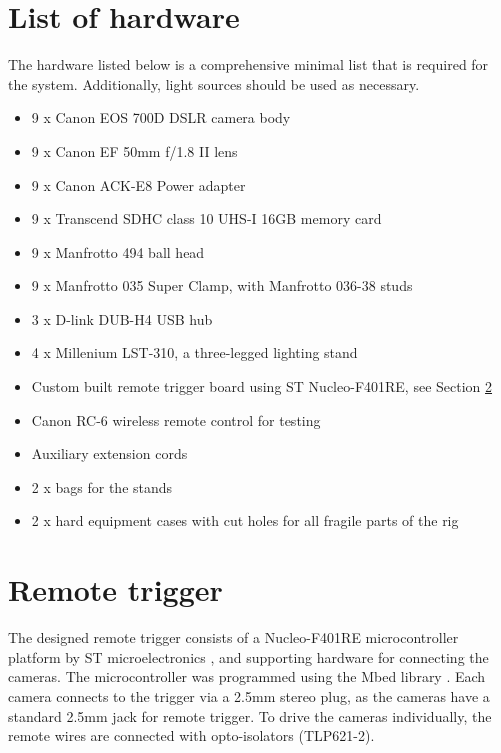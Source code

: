 \section{List of hardware} \label{app:hardwareused}

The hardware listed below is a comprehensive minimal list that is required for the system.
Additionally, light sources should be used as necessary.

\begin{itemize}
	\item 9 x Canon EOS 700D DSLR camera body
	\item 9 x Canon EF 50mm f/1.8 II lens
	\item 9 x Canon ACK-E8 Power adapter
	\item 9 x Transcend SDHC class 10 UHS-I 16GB memory card
	\item 9 x Manfrotto 494 ball head
	\item 9 x Manfrotto 035 Super Clamp, with Manfrotto 036-38 studs
	\item 3 x D-link DUB-H4 USB hub
	\item 4 x Millenium LST-310, a three-legged lighting stand
	\item Custom built remote trigger board using ST Nucleo-F401RE, see Section \ref{app:remotetrigger}
	\item Canon RC-6 wireless remote control for testing
	\item Auxiliary extension cords
	\item 2 x bags for the stands
	\item 2 x hard equipment cases with cut holes for all fragile parts of the rig
\end{itemize}


\section{Remote trigger} \label{app:remotetrigger}

The designed remote trigger consists of a Nucleo-F401RE microcontroller platform by ST microelectronics \cite{stnucleo}, and supporting hardware for connecting the cameras.
The microcontroller was programmed using the Mbed library \cite{mbednucleo}.
Each camera connects to the trigger via a 2.5mm stereo plug, as the cameras have a standard 2.5mm jack for remote trigger.
To drive the cameras individually, the remote wires are connected with opto-isolators (TLP621-2).

